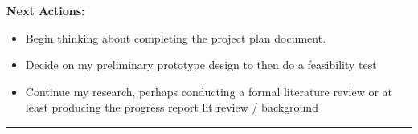 \documentclass[5pt]{article}
\begin{document}
\vspace{2em} 

\noindent \textbf{\large Next Actions:}
\begin{itemize}[label=$\bullet$]
    \item Begin thinking about completing the project plan document.
    \item Decide on my preliminary prototype design to then do a feasibility test
    \item Continue my research, perhaps conducting a formal literature review or at least producing the progress report lit review / background
\end{itemize}

\vspace{3em} 
\rule{\textwidth}{1pt}
\end{document}
